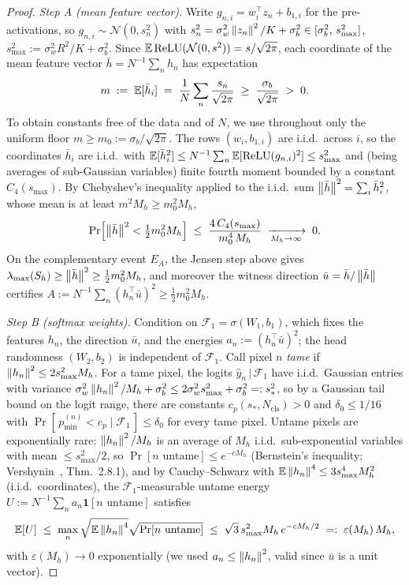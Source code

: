 \begin{proof}
\emph{Step A (mean feature vector).} Write
$g_{n,i} = w_i^\top z_n + b_{1,i}$ for the pre-activations, so
$g_{n,i} \sim \mathcal{N}(0, s_n^2)$ with
$s_n^2 = \sigma_w^2 \left\lVert z_n\right\rVert^2 / K + \sigma_b^2 \in
[\sigma_b^2,\, s_{\max}^2]$, $s_{\max}^2 := \sigma_w^2 R^2/K + \sigma_b^2$.
Since $\mathbb{E}\,\mathrm{ReLU}(\mathcal{N}(0, s^2)) = s/\sqrt{2\pi}$, each
coordinate of the mean feature vector $\bar{h} = N^{-1} \sum_n h_n$ has
expectation
\[
    m \;:=\; \mathbb{E}[\bar{h}_i]
    \;=\; \frac{1}{N} \sum_n \frac{s_n}{\sqrt{2\pi}}
    \;\geq\; \frac{\sigma_b}{\sqrt{2\pi}} \;>\; 0 .
\]
To obtain constants free of the data and of $N$, we use throughout only the
uniform floor $m \geq m_0 := \sigma_b/\sqrt{2\pi}$. The rows
$(w_i, b_{1,i})$ are i.i.d.\ across $i$, so the coordinates $\bar{h}_i$ are
i.i.d.\ with $\mathbb{E}[\bar{h}_i^2] \leq N^{-1}\sum_n
\mathbb{E}[\mathrm{ReLU}(g_{n,i})^2] \leq s_{\max}^2$ and (being averages of
sub-Gaussian variables) finite fourth moment bounded by a constant
$C_4(s_{\max})$. By Chebyshev's inequality applied to the i.i.d.\ sum
$\left\lVert\bar{h}\right\rVert^2 = \sum_i \bar{h}_i^2$, whose mean is at least
$m^2 M_h \geq m_0^2 M_h$,
\[
    \Pr\!\left[ \left\lVert\bar{h}\right\rVert^2 < \tfrac{1}{2} m_0^2 M_h \right]
    \;\leq\; \frac{4\, C_4(s_{\max})}{m_0^4\, M_h}
    \;\xrightarrow[M_h \to \infty]{}\; 0 .
\]
On the complementary event $E_A$, the Jensen step above gives
$\lambda_{\max}(S_h) \geq \left\lVert\bar{h}\right\rVert^2 \geq \tfrac{1}{2} m_0^2 M_h$, and
moreover the witness direction $\bar{u} = \bar{h}/\left\lVert\bar{h}\right\rVert$ certifies
$A := N^{-1} \sum_n (h_n^\top \bar{u})^2 \geq \tfrac{1}{2} m_0^2 M_h$.

\emph{Step B (softmax weights).} Condition on
$\mathcal{F}_1 = \sigma(W_1, b_1)$, which fixes the features $h_n$, the
direction $\bar{u}$, and the energies $a_n := (h_n^\top \bar{u})^2$; the
head randomness $(W_2, b_2)$ is independent of $\mathcal{F}_1$. Call pixel
$n$ \emph{tame} if $\left\lVert h_n\right\rVert^2 \leq 2 s_{\max}^2 M_h$. For a tame pixel,
the logits $\hat{y}_n \,|\, \mathcal{F}_1$ have i.i.d.\ Gaussian entries
with variance $\sigma_w^2 \left\lVert h_n\right\rVert^2/M_h + \sigma_b^2 \leq
2\sigma_w^2 s_{\max}^2 + \sigma_b^2 =: s_*^2$, so by a Gaussian tail bound
on the logit range, there are constants $c_p(s_*, N_{\mathrm{cls}}) > 0$ and
$\delta_0 \leq 1/16$ with
$\Pr[\, p^{(n)}_{\min} < c_p \mid \mathcal{F}_1 \,] \leq \delta_0$ for every
tame pixel. Untame pixels are exponentially rare: $\left\lVert h_n\right\rVert^2/M_h$ is an
average of $M_h$ i.i.d.\ sub-exponential variables with mean
$\leq s_{\max}^2/2$, so $\Pr[\text{$n$ untame}] \leq e^{-c M_h}$
(Bernstein's inequality; Vershynin~\citep{vershynin2018high},
Thm.~2.8.1), and by Cauchy--Schwarz with
$\mathbb{E}\left\lVert h_n\right\rVert^4 \leq 3 s_{\max}^4 M_h^2$ (i.i.d.\ coordinates), the
$\mathcal{F}_1$-measurable untame energy
$U := N^{-1} \sum_n a_n \mathbf{1}[\text{$n$ untame}]$ satisfies
\[
    \mathbb{E}[U]
    \;\leq\; \max_n \sqrt{\mathbb{E}\left\lVert h_n\right\rVert^4}
        \sqrt{\Pr[\text{$n$ untame}]}
    \;\leq\; \sqrt{3}\, s_{\max}^2 M_h\, e^{-c M_h / 2}
    \;=:\; \varepsilon(M_h)\, M_h ,
\]
with $\varepsilon(M_h) \to 0$ exponentially (we used
$a_n \leq \left\lVert h_n\right\rVert^2$, valid since $\bar{u}$ is a unit vector).


\end{proof}
